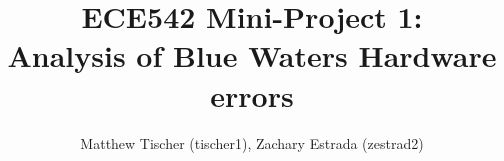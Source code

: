 \documentclass[notitlepage,groupedaddress]{IEEEtran}
\begin{document}
\title{ECE542 Mini-Project 1:\\ Analysis of Blue Waters Hardware errors}
\author{Matthew Tischer (tischer1), Zachary Estrada (zestrad2)}

\maketitle
\begin{abstract}
\end{abstract}







%
%

\end{document}

